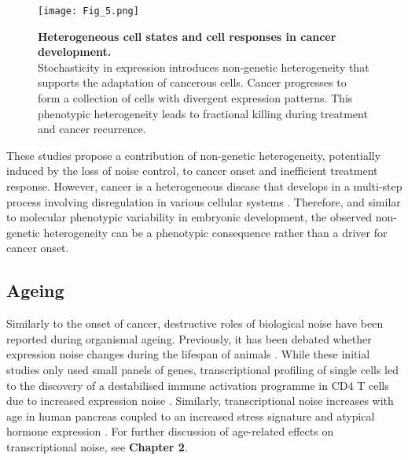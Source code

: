 \begin{figure}[!h]
\centering
\texttt{[image: Fig\_5.png]}
\caption[Heterogeneous cell states and cell responses in cancer development]{\textbf{Heterogeneous cell states and cell responses in cancer development.}\\
Stochasticity in expression introduces non-genetic heterogeneity that supports the adaptation of cancerous cells. 
Cancer progresses to form a collection of cells with divergent expression patterns. 
This phenotypic heterogeneity leads to fractional killing during treatment and cancer recurrence.}
\label{fig0:cancer}
\end{figure}

These studies propose a contribution of non-genetic heterogeneity, potentially induced by the loss of noise control, to cancer onset and inefficient treatment response.
However, cancer is a heterogeneous disease that develops in a multi-step process involving disregulation in various cellular systems \cite{Hanahan2011}. 
Therefore, and similar to molecular phenotypic variability in embryonic development, the observed non-genetic heterogeneity can be a phenotypic consequence rather than a driver for cancer onset. 

\subsection{Ageing}

Similarly to the onset of cancer, destructive roles of biological noise have been reported during organismal ageing. 
Previously, it has been debated whether expression noise changes during the lifespan of animals \cite{Bahar2006, Warren2007}. 
While these initial studies only used small panels of genes, transcriptional profiling of single cells led to the discovery of a destabilised immune activation programme in CD4\plus{} T cells due to increased expression noise \cite{Martinez-jimenez2017}. 
Similarly, transcriptional noise increases with age in human pancreas coupled to an increased stress signature and atypical hormone expression \citep{Enge2017}. 
For further discussion of age-related effects on transcriptional noise, see \textbf{Chapter 2}. 

\newpage

